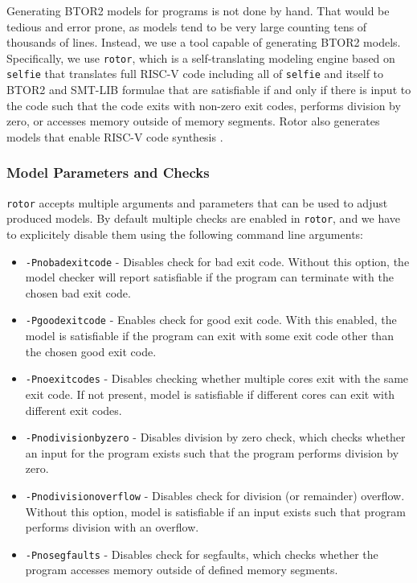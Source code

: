 \documentclass[12pt]{article}
\begin{document}
Generating BTOR2 models for programs is not done by hand. That would be tedious
and error prone, as models tend to be very large counting tens of thousands of
lines. Instead, we use a tool capable of generating BTOR2 models. Specifically,
we use \texttt{rotor}, which is a self-translating modeling engine based on
\texttt{selfie} that translates full RISC-V code including all of
\texttt{selfie} and itself to BTOR2 and SMT-LIB formulae that are satisfiable
if and only if there is input to the code such that the code exits with
non-zero exit codes, performs division by zero, or accesses memory outside of
memory segments. Rotor also generates models that enable RISC-V code synthesis
\cite{gh:rotor}.

\subsubsection{Model Parameters and Checks}

\texttt{rotor} accepts multiple arguments and parameters that can be used to
adjust produced models. By default multiple checks are enabled in
\texttt{rotor}, and we have to explicitely disable them using the following
command line arguments:

\begin{itemize}
    \item \texttt{-Pnobadexitcode} - Disables check for bad exit code. Without
        this option, the model checker will report satisfiable if the program
        can terminate with the chosen bad exit code.
    \item \texttt{-Pgoodexitcode} - Enables check for good exit code. With this
        enabled, the model is satisfiable if the program can exit with some 
        exit code other than the chosen good exit code.
    \item \texttt{-Pnoexitcodes} - Disables checking whether multiple cores
        exit with the same exit code. If not present, model is satisfiable if
        different cores can exit with different exit codes.
    \item \texttt{-Pnodivisionbyzero} - Disables division by zero check, which
        checks whether an input for the program exists such that the program
        performs division by zero.
    \item \texttt{-Pnodivisionoverflow} - Disables check for division (or
        remainder) overflow. Without this option, model is satisfiable if an
        input exists such that program performs division with an overflow.
    \item \texttt{-Pnosegfaults} - Disables check for segfaults, which checks
        whether the program accesses memory outside of defined memory segments.
\end{itemize}
\end{document}
